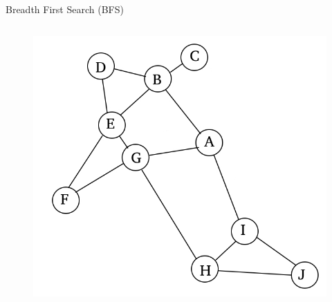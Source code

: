 \documentclass{beamer}
\begin{document}
\begin{frame}{Breadth First Search (BFS)}
	\begin{columns}[T]
		\begin{column}{.48\textwidth}
			\begin{figure}
			\centering
				\includegraphics[width=1.3\linewidth]{example.jpg}
			\end{figure}
		\end{column}
		

\end{columns}
\end{frame}
\end{document}
